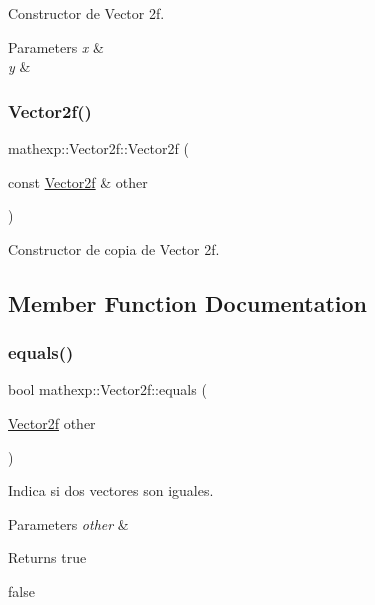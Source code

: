Constructor de Vector 2f. 


\begin{DoxyParams}{Parameters}
{\em x} & \\
\hline
{\em y} & \\
\hline
\end{DoxyParams}
\mbox{\label{structmathexp_1_1_vector2f_a6f105df3d3ca322b6e28d91ae2d1daea}} 
\subsubsection{\texorpdfstring{Vector2f()}{Vector2f()}\hspace{0.1cm}{\footnotesize\ttfamily [2/2]}}
{\footnotesize\ttfamily mathexp\+::\+Vector2f\+::\+Vector2f (\begin{DoxyParamCaption}\item[{const \mbox{\hyperlink{structmathexp_1_1_vector2f}{Vector2f}} \&}]{other }\end{DoxyParamCaption})}



Constructor de copia de Vector 2f. 



\subsection{Member Function Documentation}
\mbox{\label{structmathexp_1_1_vector2f_a0d6281bb4b05182c08dab761b9703d87}} 
\subsubsection{\texorpdfstring{equals()}{equals()}}
{\footnotesize\ttfamily bool mathexp\+::\+Vector2f\+::equals (\begin{DoxyParamCaption}\item[{\mbox{\hyperlink{structmathexp_1_1_vector2f}{Vector2f}}}]{other }\end{DoxyParamCaption})}



Indica si dos vectores son iguales. 


\begin{DoxyParams}{Parameters}
{\em other} & \\
\hline
\end{DoxyParams}
\begin{DoxyReturn}{Returns}
true 

false 
\end{DoxyReturn}
\mbox{\label{structmathexp_1_1_vector2f_a569f4a6e3ff94f19df81ca267e33fbad}} 
